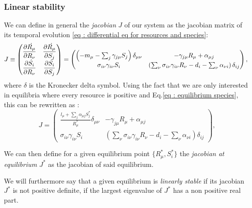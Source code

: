 \documentclass[12pt]{report}
\begin{document}
\subsubsection{Linear stability}
We can define in general the \textit{jacobian} $J$ of our system as the jacobian matrix of its temporal evolution \eqref{eq : differential eq for resources and species}:
\begin{equation}
  J \defined
\begin{pmatrix}
  \partiald{\dot{R_\mu}}{R_\nu}& \partiald{\dot{R_\mu}}{S_j} \\
  \partiald{\dot{S_i}}{R_\nu} & \partiald{\dot{S_i}}{S_j}
\end{pmatrix}
=
\begin{pmatrix}
  \left(-m_\mu-\sum_j \gamma_{j\mu}S_j\right)\delta_{\mu\nu} & -\gamma_{j\mu}R_\mu+\alpha_{\mu j} \\
  \sigma_{i\nu}\gamma_{i\nu}S_i &\left(\sum_{\nu} \sigma_{i\nu}\gamma_{i\nu}R_\nu-d_i-\sum_\nu \alpha_{\nu i}\right)\delta_{ij}
\end{pmatrix}, \label{eq : definition of jacobian}
\end{equation}
where $\delta$ is the Kronecker delta symbol. Using the fact that we are only interested in equilibria where every resource is positive and Eq.\eqref{eq : equilibrium species}, this can be rewritten as :
\begin{equation}
 J = \begin{pmatrix}
   \frac{l_\mu + \sum_j \alpha_{\mu j}S_j^*}{R^*_\mu}\delta_{\mu\nu} & -\gamma_{j\mu}R_\mu+\alpha_{\mu j} \\
   \sigma_{i\nu}\gamma_{i\nu}S_i &\left(\sum_{\nu} \sigma_{i\nu}\gamma_{i\nu}R_\nu-d_i-\sum_\nu \alpha_{\nu i}\right)\delta_{ij}
 \end{pmatrix}, \label{eq : definition of jacobian alternative}
\end{equation}

We can then define for a given equilibrium point $\{R^*_\mu, S^*_i\}$ the \textit{jacobian at equilibrium} $J^*$ as the jacobian of said equilibrium.

We will furthermore say that a given equilibrium is \textit{linearly stable} if its jacobian $J^*$ is not positive definite, \ie if the largest eigenvalue of $J^*$ has a non positive real part.
\end{document}
